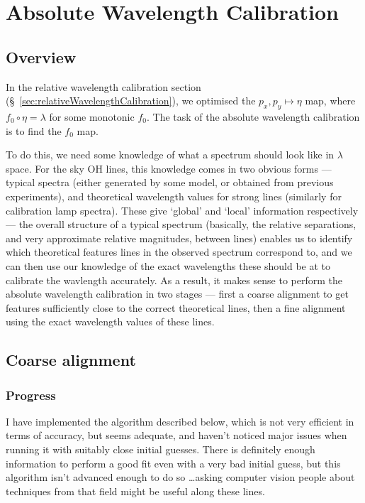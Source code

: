 \section{Absolute Wavelength Calibration}
\label{sec:absoluteWavelengthCalibration}

\subsection{Overview}

In the relative wavelength calibration section
(\S~\ref{sec:relativeWavelengthCalibration}), we optimised the $p_x, p_y
\mapsto \eta$ map, where $f_0 \circ \eta = \lambda$ for some monotonic
$f_0$. The task of the absolute wavelength calibration is to find the
$f_0$ map.

To do this, we need some knowledge of what a spectrum should look like
in $\lambda$ space. For the sky OH lines, this knowledge comes in two obvious
forms --- typical spectra (either generated by some model, or obtained
from previous experiments), and theoretical wavelength values for
strong lines (similarly for calibration lamp spectra). These give
`global' and `local' information respectively --- the overall structure
of a typical spectrum (basically, the relative separations, and very
approximate relative magnitudes, between lines) enables us to identify
which theoretical features lines in the observed spectrum correspond
to, and we can then use our knowledge of the exact wavelengths these
should be at to calibrate the wavlength accurately. As a result, it
makes sense to perform the absolute wavelength calibration in two
stages --- first a coarse alignment to get features sufficiently close
to the correct theoretical lines, then a fine alignment using the exact
wavelength values of these lines.


\subsection{Coarse alignment}


\subsubsection{Progress}

I have implemented the algorithm described below, which is not very
efficient in terms of accuracy, but seems adequate, and haven't noticed
major issues when running it with suitably close initial guesses. There
is definitely enough information to perform a good fit even with a very
bad initial guess, but this algorithm isn't advanced enough to do so
\dots asking computer vision people about techniques from that field
might be useful along these lines.

